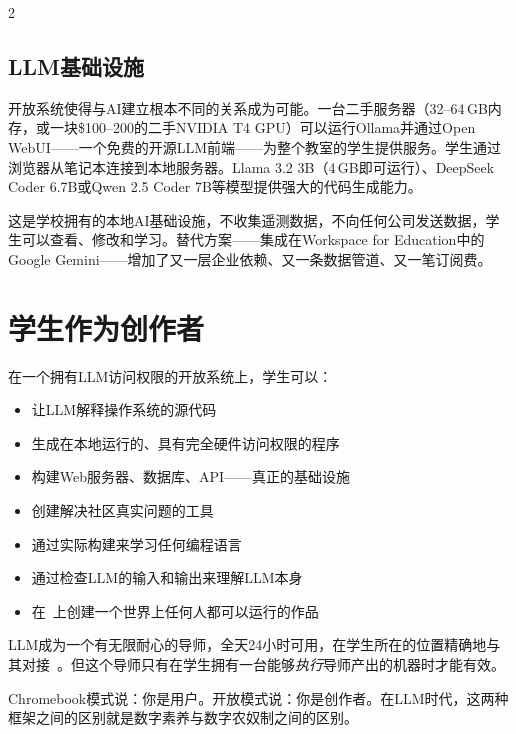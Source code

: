 \documentclass[11pt, a4paper]{article}
\begin{document}
\begin{multicols}{2}
\subsection{LLM基础设施}

开放系统使得与AI建立根本不同的关系成为可能。一台二手服务器（32--64\,GB内存，或一块\$100--200的二手NVIDIA T4 GPU）可以运行Ollama并通过Open WebUI——一个免费的开源LLM前端——为整个教室的学生提供服务。学生通过浏览器从笔记本连接到本地服务器。Llama 3.2 3B（4\,GB即可运行）、DeepSeek Coder 6.7B或Qwen 2.5 Coder 7B等模型提供强大的代码生成能力。

这是学校拥有的本地AI基础设施，不收集遥测数据，不向任何公司发送数据，学生可以查看、修改和学习。替代方案——集成在Workspace for Education中的Google Gemini——增加了又一层企业依赖、又一条数据管道、又一笔订阅费。


\section{学生作为创作者}

在一个拥有LLM访问权限的开放系统上，学生可以：

\begin{itemize}
  \item 让LLM解释操作系统的源代码
  \item 生成在本地运行的、具有完全硬件访问权限的程序
  \item 构建Web服务器、数据库、API——真正的基础设施
  \item 创建解决社区真实问题的工具
  \item 通过实际构建来学习任何编程语言
  \item 通过检查LLM的输入和输出来理解LLM本身
  \item 在\ac{}~\citep{scudder2026ac}上创建一个世界上任何人都可以运行的作品
\end{itemize}

LLM成为一个有无限耐心的导师，全天24小时可用，在学生所在的位置精确地与其对接~\citep{khan2024bravenew}。但这个导师只有在学生拥有一台能够\emph{执行}导师产出的机器时才能有效。

Chromebook模式说：你是用户。开放模式说：你是创作者。在LLM时代，这两种框架之间的区别就是数字素养与数字农奴制之间的区别。



\end{multicols}
\end{document}

